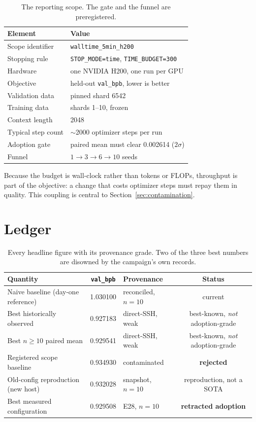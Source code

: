 \documentclass[11pt,a4paper]{article}
\newcommand{\bpb}{\texttt{val\_bpb}}
\newcommand{\gate}{\ensuremath{2\sigma}}
\begin{document}
\begin{table}[h]
\centering
\small
\begin{tabular}{@{}ll@{}}
\toprule
\textbf{Element} & \textbf{Value} \\
\midrule
Scope identifier      & \texttt{walltime\_5min\_h200} \\
Stopping rule         & \texttt{STOP\_MODE=time}, \texttt{TIME\_BUDGET=300} \\
Hardware              & one NVIDIA H200, one run per GPU \\
Objective             & held-out \bpb{}, lower is better \\
Validation data       & pinned shard 6542 \\
Training data         & shards 1--10, frozen \\
Context length        & 2048 \\
Typical step count    & $\sim$2000 optimizer steps per run \\
Adoption gate         & paired mean must clear \num{0.002614} (\gate{}) \\
Funnel                & $1 \rightarrow 3 \rightarrow 6 \rightarrow 10$ seeds \\
\bottomrule
\end{tabular}
\caption{The reporting scope. The gate and the funnel are preregistered.}
\end{table}

Because the budget is wall-clock rather than tokens or FLOPs, throughput is part of the
objective: a change that costs optimizer steps must repay them in quality. This coupling is
central to Section~\ref{sec:contamination}.

\section{Ledger}

\begin{table}[h]
\centering
\small
\begin{tabular}{@{}lS[table-format=1.6]lc@{}}
\toprule
\textbf{Quantity} & {\textbf{\bpb}} & \textbf{Provenance} & \textbf{Status} \\
\midrule
Naive baseline (day-one reference) & 1.030100 & reconciled, $n=10$ & current \\
Best historically observed         & 0.927183 & direct-SSH, weak     & best-known, \emph{not} adoption-grade \\
Best $n\!\geq\!10$ paired mean     & 0.929541 & direct-SSH, weak     & best-known, \emph{not} adoption-grade \\
Registered scope baseline          & 0.934930 & contaminated         & \textbf{rejected} \\
Old-config reproduction (new host) & 0.932028 & snapshot, $n=10$     & reproduction, not a SOTA \\
Best measured configuration        & 0.929508 & E28, $n=10$          & \textbf{retracted adoption} \\
\bottomrule
\end{tabular}
\caption{Every headline figure with its provenance grade. Two of the three best numbers are
disowned by the campaign's own records.}
\label{tab:ledger}
\end{table}
\end{document}
